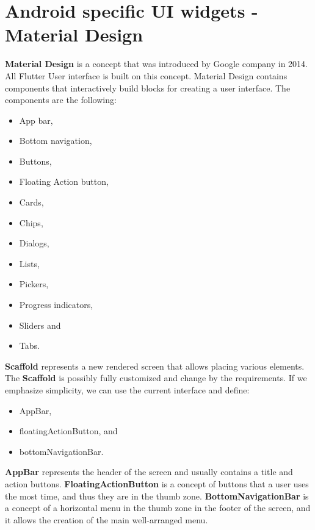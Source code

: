 \section{Android specific UI widgets - Material Design}\label{sec:android-specific-ui-widgets}
\textbf{Material Design} is a concept that was introduced by Google company in 2014.\cite{materialDesignArticle}
All Flutter User interface is built on this concept.
Material Design contains components that interactively build blocks for creating a user interface.
The components are the following:
\begin{itemize}
    \item App bar,
    \item Bottom navigation,
    \item Buttons,
    \item Floating Action button,
    \item Cards,
    \item Chips,
    \item Dialogs,
    \item Lists,
    \item Pickers,
    \item Progress indicators,
    \item Sliders and
    \item Tabs.\cite{materialDesign}
\end{itemize}

\textbf{Scaffold} represents a new rendered screen that allows placing various elements.
The \textbf{Scaffold} is possibly fully customized and change by the requirements.
If we emphasize simplicity, we can use the current interface and define:
\begin{itemize}
    \item AppBar,
    \item floatingActionButton, and
    \item bottomNavigationBar.
\end{itemize}
\textbf{AppBar} represents the header of the screen and usually contains a title and action buttons.
\textbf{FloatingActionButton} is a concept of buttons that a user uses the most time, and thus they are in the thumb zone.
\textbf{BottomNavigationBar} is a concept of a horizontal menu in the thumb zone in the footer of the screen, and it allows the creation of the main well-arranged menu.
